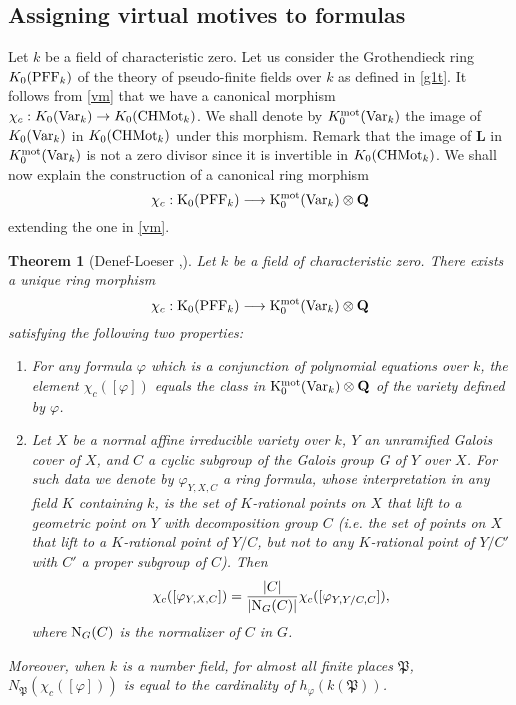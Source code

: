 \documentclass[english,12pt]{amsart}
\let\got\mathfrak
\def\gP{{\got P}}
\def\LL{{\mathbf L}}
\newtheorem{theorem}[subsubsection]{Theorem}
\theoremstyle{definition}
\theoremstyle{remark}
\theoremstyle{plain}
\numberwithin{equation}{subsection}
\let\got\mathfrak
\def\LL{{\mathbf L}}
\begin{document}
\subsection{Assigning virtual motives to formulas}
Let $k$ be a field of characteristic
zero.
Let us consider
the Grothendieck
ring $K_0 ({\rm PFF}_k)$ of the 
theory of pseudo-finite fields over $k$ as defined in \ref{g1t}.
It follows from \ref{vm} that we have a canonical morphism
$\chi_c :  K_0 ({\rm Var}_k) \rightarrow K_0 ({\rm CHMot}_k)$.
We shall denote by $K_0^{\rm mot} ({\rm Var}_k) $
the image of 
$K_0 ({\rm Var}_k)$
in
$K_0 ({\rm CHMot}_k)$ under this morphism.
Remark that the image of $\LL$
in
$K_0^{\rm mot} ({\rm Var}_k)$  is not a zero divisor since it is 
invertible in 
$K_0 ({\rm CHMot}_k)$.
We shall now explain the construction of a canonical ring morphism
$$ \chi_c : {\rm K}_0
({\rm PFF}_k ) \longrightarrow {\rm K}_0^{\rm mot} ({\rm Var}_{k} )
\otimes {\bf Q} $$
extending the one in \ref{vm}.

\begin{theorem}[Denef-Loeser \cite{def},\cite{icm}]\label{imp}Let $k$
be a field of characteristic zero.
There exists a unique ring morphism $$ \chi_c : {\rm K}_0
({\rm PFF}_k ) \longrightarrow {\rm K}_0^{\rm mot} ({\rm Var}_{k} )
\otimes {\bf Q} $$
satisfying  the following two properties:
\begin{enumerate}\item[(i)] For any formula $\varphi$ which is a conjunction of polynomial equations
over $k$, the element $\chi_c ([\varphi])$ equals the
class in ${\rm K}_0^{\rm mot} ({\rm Var}_{k}  ) \otimes {\bf Q}$ of the
variety defined
by $\varphi$.
\item[(ii)] Let $X$ be a normal affine irreducible variety over $k$, $Y$ an unramified
Galois cover of
$X$, and $C$ a cyclic subgroup of the Galois group G of $Y$ over $X$. For such data we
denote by
$\varphi_{Y,X,C}$ a ring formula, whose interpretation in any field $K$ containing
$k$, is the set of $K$-rational points on $X$ that lift to a geometric
point on $Y$ with decomposition group $C$ (i.e. the set of points on $X$ that lift to a $K$-rational
point of $Y/C$, but not to any $K$-rational point of $Y/C'$ with $C'$ a proper subgroup of
$C$). Then
\[
\chi_c ([\varphi_{Y,X,C} ]) = \frac{{\left| C \right|}}{{\left|
{{\rm N}_{G} (C)} \right|}}\chi_c ([\varphi_{Y,Y/C,C}
]),\]
where ${\rm N}_{G} (C)$ is the normalizer of $C$ in $G$.
\end{enumerate}
Moreover, when  $k$ is a number field,
for almost all finite places $\gP$,
$ N_{\gP} (\chi_c ([\varphi]))$ is
equal to the cardinality of $h_{\varphi} (k(\gP))$.
\end{theorem}
\end{document}
